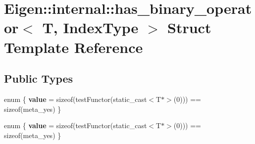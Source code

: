 \hypertarget{struct_eigen_1_1internal_1_1has__binary__operator}{}\section{Eigen\+:\+:internal\+:\+:has\+\_\+binary\+\_\+operator$<$ T, Index\+Type $>$ Struct Template Reference}
\label{struct_eigen_1_1internal_1_1has__binary__operator}
\subsection*{Public Types}
\begin{DoxyCompactItemize}
\item 
\mbox{\label{struct_eigen_1_1internal_1_1has__binary__operator_acbfc19837f8a1d9c4506745e21d2e44f}} 
enum \{ {\bfseries value} = sizeof(test\+Functor(static\+\_\+cast$<$T$\ast$$>$(0))) == sizeof(meta\+\_\+yes)
 \}
\item 
\mbox{\label{struct_eigen_1_1internal_1_1has__binary__operator_af6f16fdf75f678b0d1626bfad3817e14}} 
enum \{ {\bfseries value} = sizeof(test\+Functor(static\+\_\+cast$<$T$\ast$$>$(0))) == sizeof(meta\+\_\+yes)
 \}
\end{DoxyCompactItemize}
